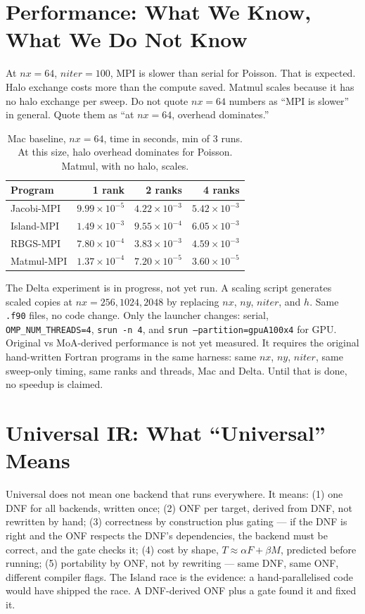 \documentclass[11pt]{article}
\begin{document}
\section{Performance: What We Know, What We Do Not Know}
At $nx=64$, $niter=100$, MPI is slower than serial for Poisson. That is
expected. Halo exchange costs more than the compute saved. Matmul scales
because it has no halo exchange per sweep. Do not quote $nx=64$ numbers as
``MPI is slower'' in general. Quote them as ``at $nx=64$, overhead dominates.''
\begin{table}[h]
\centering
\small
\begin{tabular}{lrrr}
\toprule
Program & 1 rank & 2 ranks & 4 ranks \\
\midrule
Jacobi-MPI & $9.99 \times 10^{-5}$ & $4.22 \times 10^{-3}$ & $5.42 \times 10^{-3}$ \\
Island-MPI & $1.49 \times 10^{-3}$ & $9.55 \times 10^{-4}$ & $6.05 \times 10^{-3}$ \\
RBGS-MPI & $7.80 \times 10^{-4}$ & $3.83 \times 10^{-3}$ & $4.59 \times 10^{-3}$ \\
Matmul-MPI & $1.37 \times 10^{-4}$ & $7.20 \times 10^{-5}$ & $3.60 \times 10^{-5}$ \\
\bottomrule
\end{tabular}
\caption{Mac baseline, $nx=64$, time in seconds, min of 3 runs. At this size,
halo overhead dominates for Poisson. Matmul, with no halo, scales.}
\label{tab:perf-mac}
\end{table}
The Delta experiment is in progress, not yet run. A scaling script generates
scaled copies at $nx=256, 1024, 2048$ by replacing $nx$, $ny$, $niter$, and
$h$. Same \texttt{.f90} files, no code change. Only the launcher changes:
serial, \texttt{OMP\_NUM\_THREADS=4}, \texttt{srun -n 4}, and
\texttt{srun --partition=gpuA100x4} for GPU. Original vs MoA-derived
performance is not yet measured. It requires the original hand-written
Fortran programs in the same harness: same $nx$, $ny$, $niter$, same
sweep-only timing, same ranks and threads, Mac and Delta. Until that is done,
no speedup is claimed.

\section{Universal IR: What ``Universal'' Means}
Universal does not mean one backend that runs everywhere. It means:
(1) one DNF for all backends, written once; (2) ONF per target, derived
from DNF, not rewritten by hand; (3) correctness by construction plus
gating --- if the DNF is right and the ONF respects the DNF's dependencies,
the backend must be correct, and the gate checks it; (4) cost by shape,
$T \approx \alpha F + \beta M$, predicted before running; (5) portability
by ONF, not by rewriting --- same DNF, same ONF, different compiler flags.
The Island race is the evidence: a hand-parallelised code would have shipped
the race. A DNF-derived ONF plus a gate found it and fixed it.
\end{document}
